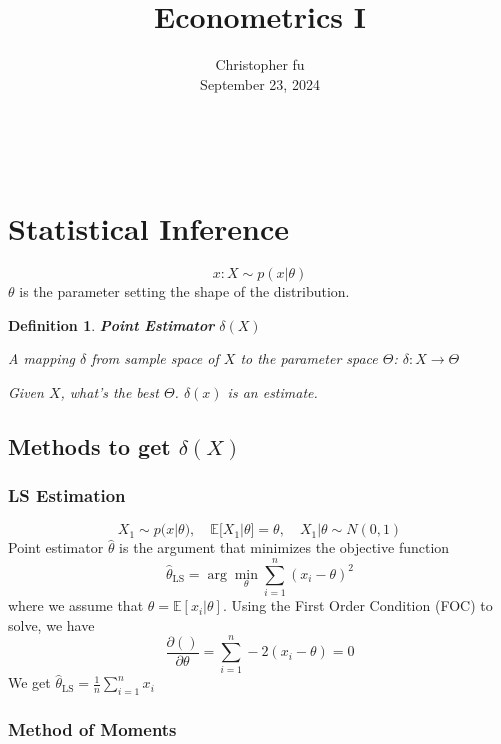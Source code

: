 \documentclass{article}
\newcommand{\tmaffiliation}[1]{\\ #1}
\newcommand{\tmtextit}[1]{\text{{\itshape{#1}}}}
\newtheorem{definition}{Definition}
\begin{document}
\title{Econometrics I}

\author{
  Christopher fu
  \tmaffiliation{\tmtextit{Verison:} September 23, 2024}
}

\maketitle

{\tableofcontents}

\

\section{Statistical Inference}

\[ x : X \sim p(x|\theta) \]
$\theta$ is the parameter setting the shape of the distribution.

\begin{definition}
  \textbf{\color{blue}Point Estimator} $\delta(X)$
  
  A mapping $\delta$ from sample space of $X$ to the parameter space $\Theta$:
  $\delta : X \rightarrow \Theta$
  
  Given $X$, what's the best $\Theta$. $\delta(x)$ is an estimate.
\end{definition}

\subsection{Methods to get $\delta(X)$}

\subsubsection{LS Estimation}

\[ X_1 \sim p(x|\theta), \quad \mathbb{E}[X_1|\theta] = \theta, \quad X_1|\theta \sim N(0, 1) \]
Point estimator $\hat{\theta}$ is the argument that minimizes the objective function
\[ \hat{\theta}_{\text{LS}} = \arg \min_{\theta} \sum_{i=1}^n (x_i - \theta)^2 \]
where we assume that $\theta = \mathbb{E}[x_i|\theta]$. Using the First Order Condition (FOC) to solve, we have
\[ \frac{\partial ()}{\partial \theta} = \sum_{i=1}^n -2(x_i - \theta) = 0 \]
We get $\hat{\theta}_{\text{LS}} = \frac{1}{n} \sum_{i=1}^n x_i$

\subsubsection{Method of Moments}
\end{document}

